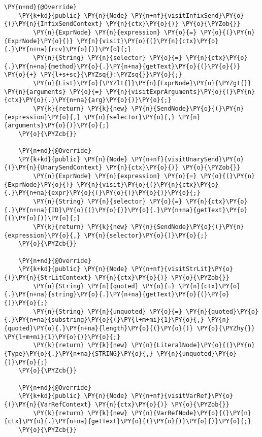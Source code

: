 \begin{Verbatim}[commandchars=\\\{\}]
    \PY{n+nd}{@Override}
    \PY{k+kd}{public} \PY{n}{Node} \PY{n+nf}{visitInfixSend}\PY{o}{(}\PY{n}{InfixSendContext} \PY{n}{ctx}\PY{o}{)} \PY{o}{\PYZob{}}
        \PY{n}{ExprNode} \PY{n}{expression} \PY{o}{=} \PY{o}{(}\PY{n}{ExprNode}\PY{o}{)} \PY{n}{visit}\PY{o}{(}\PY{n}{ctx}\PY{o}{.}\PY{n+na}{rcv}\PY{o}{)}\PY{o}{;}
        \PY{n}{String} \PY{n}{selector} \PY{o}{=} \PY{n}{ctx}\PY{o}{.}\PY{n+na}{method}\PY{o}{.}\PY{n+na}{getText}\PY{o}{(}\PY{o}{)} \PY{o}{+} \PY{l+s+sc}{\PYZsq{}:\PYZsq{}}\PY{o}{;}
        \PY{n}{List}\PY{o}{\PYZlt{}}\PY{n}{ExprNode}\PY{o}{\PYZgt{}} \PY{n}{arguments} \PY{o}{=} \PY{n}{visitExprArguments}\PY{o}{(}\PY{n}{ctx}\PY{o}{.}\PY{n+na}{arg}\PY{o}{)}\PY{o}{;}
        \PY{k}{return} \PY{k}{new} \PY{n}{SendNode}\PY{o}{(}\PY{n}{expression}\PY{o}{,} \PY{n}{selector}\PY{o}{,} \PY{n}{arguments}\PY{o}{)}\PY{o}{;}
    \PY{o}{\PYZcb{}}

    \PY{n+nd}{@Override}
    \PY{k+kd}{public} \PY{n}{Node} \PY{n+nf}{visitUnarySend}\PY{o}{(}\PY{n}{UnarySendContext} \PY{n}{ctx}\PY{o}{)} \PY{o}{\PYZob{}}
        \PY{n}{ExprNode} \PY{n}{expression} \PY{o}{=} \PY{o}{(}\PY{n}{ExprNode}\PY{o}{)} \PY{n}{visit}\PY{o}{(}\PY{n}{ctx}\PY{o}{.}\PY{n+na}{expr}\PY{o}{(}\PY{o}{)}\PY{o}{)}\PY{o}{;}
        \PY{n}{String} \PY{n}{selector} \PY{o}{=} \PY{n}{ctx}\PY{o}{.}\PY{n+na}{ID}\PY{o}{(}\PY{o}{)}\PY{o}{.}\PY{n+na}{getText}\PY{o}{(}\PY{o}{)}\PY{o}{;}
        \PY{k}{return} \PY{k}{new} \PY{n}{SendNode}\PY{o}{(}\PY{n}{expression}\PY{o}{,} \PY{n}{selector}\PY{o}{)}\PY{o}{;}
    \PY{o}{\PYZcb{}}

    \PY{n+nd}{@Override}
    \PY{k+kd}{public} \PY{n}{Node} \PY{n+nf}{visitStrLit}\PY{o}{(}\PY{n}{StrLitContext} \PY{n}{ctx}\PY{o}{)} \PY{o}{\PYZob{}}
        \PY{n}{String} \PY{n}{quoted} \PY{o}{=} \PY{n}{ctx}\PY{o}{.}\PY{n+na}{string}\PY{o}{.}\PY{n+na}{getText}\PY{o}{(}\PY{o}{)}\PY{o}{;}
        \PY{n}{String} \PY{n}{unquoted} \PY{o}{=} \PY{n}{quoted}\PY{o}{.}\PY{n+na}{substring}\PY{o}{(}\PY{l+m+mi}{1}\PY{o}{,} \PY{n}{quoted}\PY{o}{.}\PY{n+na}{length}\PY{o}{(}\PY{o}{)} \PY{o}{\PYZhy{}} \PY{l+m+mi}{1}\PY{o}{)}\PY{o}{;}
        \PY{k}{return} \PY{k}{new} \PY{n}{LiteralNode}\PY{o}{(}\PY{n}{Type}\PY{o}{.}\PY{n+na}{STRING}\PY{o}{,} \PY{n}{unquoted}\PY{o}{)}\PY{o}{;}
    \PY{o}{\PYZcb{}}

    \PY{n+nd}{@Override}
    \PY{k+kd}{public} \PY{n}{Node} \PY{n+nf}{visitVarRef}\PY{o}{(}\PY{n}{VarRefContext} \PY{n}{ctx}\PY{o}{)} \PY{o}{\PYZob{}}
        \PY{k}{return} \PY{k}{new} \PY{n}{VarRefNode}\PY{o}{(}\PY{n}{ctx}\PY{o}{.}\PY{n+na}{getText}\PY{o}{(}\PY{o}{)}\PY{o}{)}\PY{o}{;}
    \PY{o}{\PYZcb{}}


\end{Verbatim}

